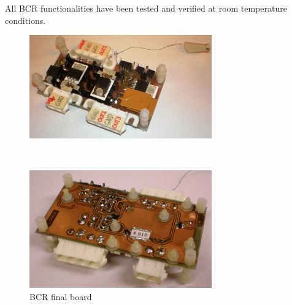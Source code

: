 %
All \ac{BCR} functionalities have been tested and verified at room temperature conditions.
%
%
%
\begin{figure}[H]
\begin{minipage}[t]{\linewidth}
\centering
\includegraphics[width=0.7\textwidth]{figures/fig_BCR_top}
\end{minipage}
\\[1mm]
\begin{minipage}[t]{\linewidth}
\centering
\includegraphics[width=0.7\textwidth]{figures/fig_BCR_bottom}
\end{minipage}
\caption{\acl{BCR} final board}
\label{fig:BCR_top_bottom}
\end{figure}
%
